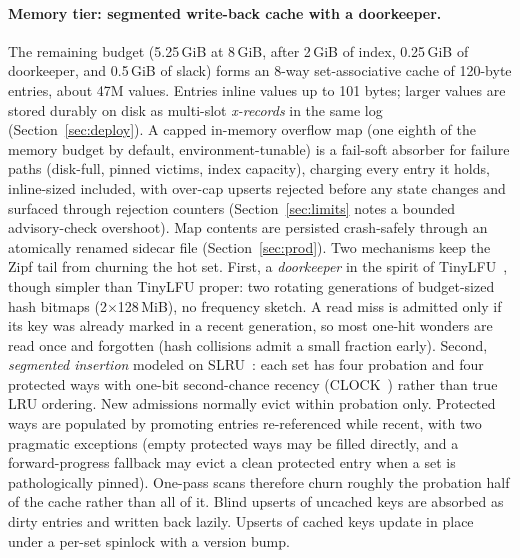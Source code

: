\documentclass{article}
\newcommand{\MemBudget}{8\,GiB}
\begin{document}
\paragraph{Memory tier: segmented write-back cache with a doorkeeper.}
The remaining budget (5.25\,GiB at \MemBudget, after 2\,GiB of index, 0.25\,GiB of doorkeeper, and 0.5\,GiB of slack) forms an 8-way set-associative cache of 120-byte entries, about 47M values. Entries inline values up to 101 bytes; larger values are stored durably on disk as multi-slot \emph{x-records} in the same log (Section~\ref{sec:deploy}). A capped in-memory overflow map (one eighth of the memory budget by default, environment-tunable) is a fail-soft absorber for failure paths (disk-full, pinned victims, index capacity), charging every entry it holds, inline-sized included, with over-cap upserts rejected before any state changes and surfaced through rejection counters (Section~\ref{sec:limits} notes a bounded advisory-check overshoot). Map contents are persisted crash-safely through an atomically renamed sidecar file (Section~\ref{sec:prod}). Two mechanisms keep the Zipf tail from churning the hot set. First, a \emph{doorkeeper} in the spirit of TinyLFU~\cite{tinylfu}, though simpler than TinyLFU proper: two rotating generations of budget-sized hash bitmaps (2$\times$128\,MiB), no frequency sketch. A read miss is admitted only if its key was already marked in a recent generation, so most one-hit wonders are read once and forgotten (hash collisions admit a small fraction early). Second, \emph{segmented insertion} modeled on SLRU~\cite{slru}: each set has four probation and four protected ways with one-bit second-chance recency (CLOCK~\cite{clock}) rather than true LRU ordering. New admissions normally evict within probation only. Protected ways are populated by promoting entries re-referenced while recent, with two pragmatic exceptions (empty protected ways may be filled directly, and a forward-progress fallback may evict a clean protected entry when a set is pathologically pinned). One-pass scans therefore churn roughly the probation half of the cache rather than all of it. Blind upserts of uncached keys are absorbed as dirty entries and written back lazily. Upserts of cached keys update in place under a per-set spinlock with a version bump.
\end{document}
